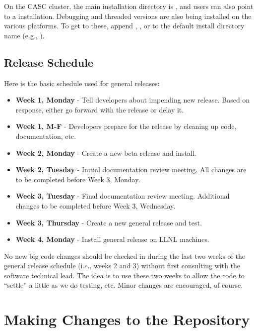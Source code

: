 \noindent
On the CASC cluster, the main installation directory is
, and users can also point to a
 installation.
Debugging and threaded versions are also being installed on the
various platforms.  To get to these, append ,
, or  to the default install
directory name (e.g., ).

\subsection{Release Schedule}
\label{Release Schedule}

Here is the basic schedule used for general releases:
\begin{itemize}
\item {\bf Week 1, Monday} - Tell developers about impending new release.
Based on response, either go forward with the release or delay it.
\item {\bf Week 1, M-F} - Developers prepare for the release by cleaning
up code, documentation, etc.
\item {\bf Week 2, Monday} - Create a new beta release and install.
\item {\bf Week 2, Tuesday} - Initial documentation review meeting.
All changes are to be completed before Week 3, Monday.
\item {\bf Week 3, Tuesday} - Final documentation review meeting.
Additional changes to be completed before Week 3, Wednesday.
\item {\bf Week 3, Thursday} - Create a new general release and test.
\item {\bf Week 4, Monday} - Install general release on LLNL machines.
\end{itemize}

No new big code changes should be checked in during the last two weeks
of the general release schedule (i.e., weeks 2 and 3) without first
consulting with the \hypre{} software technical lead.  The idea is to
use these two weeks to allow the code to ``settle'' a little as we do
testing, etc.  Minor changes are encouraged, of course.

\section{Making Changes to the Repository}
\label{Making Changes to the Repository}


